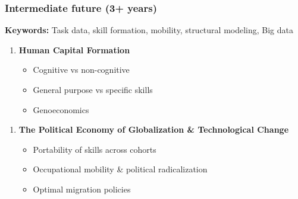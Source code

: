 \documentclass[10pt]{beamer}
\begin{document}
\begin{frame} 
	\frametitle{Intermediate future (3+ years)}
	
\textbf{Keywords:} Task data, skill formation, mobility, structural modeling, Big data

\bigskip	
	
\begin{enumerate}
	\item \textbf{Human Capital Formation}
	\begin{itemize}
		\item Cognitive vs non-cognitive
		\item General purpose vs specific skills
		\item Genoeconomics
	\end{itemize}
\end{enumerate}

\bigskip

\begin{enumerate}
	\item \textbf{The Political Economy of Globalization \& Technological Change}
	\begin{itemize}
		\item Portability of skills across cohorts
		\item Occupational mobility \& political radicalization
		\item Optimal migration policies
	\end{itemize}
\end{enumerate}	




	
	
\end{frame}
\end{document}
